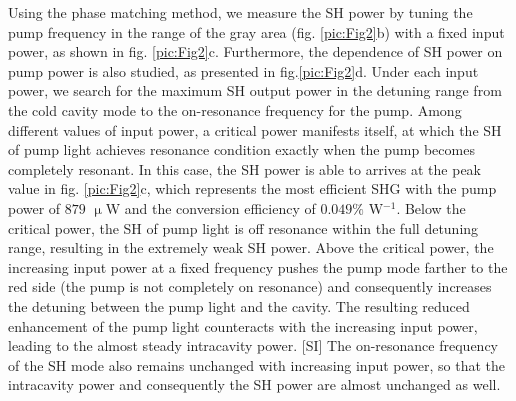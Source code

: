 \documentclass[a4paper,8pt,hyperref, twocolumn]{article}
\begin{document}


Using the phase matching method, we measure the SH power by tuning the pump frequency in the range of the gray area (fig. \ref{pic:Fig2}b) with a fixed input power, as shown in fig. \ref{pic:Fig2}c.%
Furthermore, the dependence of SH power on pump power is also studied, as presented in fig.\ref{pic:Fig2}d. 
Under each input power, we search for the maximum SH output power in the detuning range from the cold cavity mode to the on-resonance frequency for the pump. 
Among different values of input power, a critical power manifests itself, at which the SH of pump light achieves resonance condition exactly when the pump becomes completely resonant. %
In this case, the SH power is able to arrives at the peak value in fig. \ref{pic:Fig2}c, which represents the most efficient SHG with the pump power of $879$ $\upmu$W and the conversion efficiency of $0.049\%$ W$^{-1}$.
Below the critical power, the SH of pump light is off resonance within the full detuning range, resulting in the extremely weak SH power.
Above the critical power, the increasing input power at a fixed frequency pushes the pump mode farther to the red side (the pump is not completely on resonance) and consequently increases the detuning between the pump light and the cavity.
The resulting reduced enhancement of the pump light counteracts with the increasing input power, leading to the almost steady intracavity power. [SI]
The on-resonance frequency of the SH mode also remains unchanged with increasing input power, so that the intracavity power and consequently the SH power are almost unchanged as well. %
\end{document}
